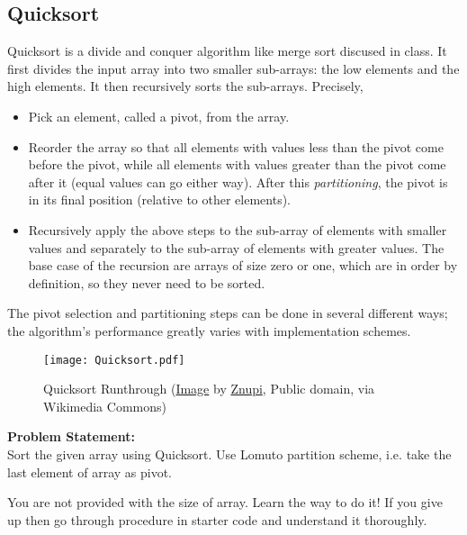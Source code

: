 \recalctypearea
\subsection{Quicksort}
Quicksort is a divide and conquer algorithm like merge sort discused in class. It first divides the input array into two smaller sub-arrays: the low elements and the high elements. It then
recursively sorts the sub-arrays. Precisely,
\begin{itemize}
	\item Pick an element, called a pivot, from the array.
	\item Reorder the array so that all elements with values less than the pivot come before the pivot, while all elements with values greater than the pivot come after it (equal values can go either way). After this \emph{partitioning}, the pivot is in its final position (relative to other elements).
	\item Recursively apply the above steps to the sub-array of elements with smaller values and separately to the sub-array of elements with greater values. The base case of the recursion are arrays of size zero or one, which are in order by definition, so they never need to be sorted.
\end{itemize}
\begin{note}
	The pivot selection and partitioning steps can be done in several different ways; the algorithm's performance greatly varies with implementation schemes.
\end{note}
\begin{figure}[H]
	\centering
	\texttt{[image: Quicksort.pdf]}
	\caption{Quicksort Runthrough (\href{https://commons.wikimedia.org/wiki/File:Quicksort-diagram.svg}{Image} by \href{https://commons.wikimedia.org/wiki/User:Znupi}{Znupi}, Public domain, via Wikimedia Commons)}
	\label{fig:quicksort}
\end{figure}
\textbf{Problem Statement:}\\
Sort the given array using Quicksort. Use Lomuto partition scheme, i.e. take the last element of array as pivot.
\begin{note}
	You are not provided with the size of array. Learn the way to do it! If you give up then go through procedure in starter code and understand it thoroughly.
\end{note}
